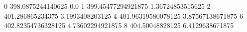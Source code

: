 0 398.0875244140625 0.0
1 399.45477294921875 1.36724853515625
2 401.286865234375 3.1993408203125
4 401.96319580078125 3.87567138671875
6 402.82354736328125 4.73602294921875
8 404.50048828125 6.4129638671875
